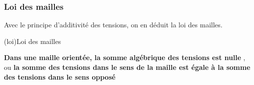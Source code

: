 \documentclass[../../main/main.tex]{subfiles}
\begin{document}
\subsubsection{Loi des mailles}

Avec le principe d'additivité des tensions, on en déduit la loi des mailles.
\begin{tcb*}[label=loi:mailles, sidebyside, halign upper=center](loi){Loi des mailles}

	\textbf{Dans une maille orientée, la somme algébrique des tensions est nulle
	}, ou \textbf{la somme des tensions dans le sens de la maille est égale à la
		somme des tensions dans le sens opposé}
	\tcblower
	\begin{center}
	\end{center}
\end{tcb*}
\end{document}
